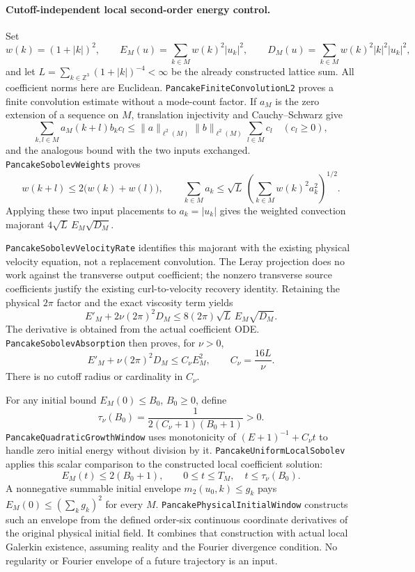 \documentclass[11pt]{article}
\theoremstyle{definition}
\begin{document}
\paragraph{Cutoff-independent local second-order energy control.}
Set
\[
 w(k)=(1+|k|)^2,\qquad
 E_M(u)=\sum_{k\in M}w(k)^2|u_k|^2,\qquad
 D_M(u)=\sum_{k\in M}w(k)^2|k|^2|u_k|^2,
\]
and let $L=\sum_{k\in\mathbb Z^3}(1+|k|)^{-4}<\infty$ be the
already constructed lattice sum. All coefficient norms here are Euclidean.
\texttt{PancakeFiniteConvolutionL2} proves a finite convolution estimate
without a mode-count factor. If $a_M$ is the zero extension of a sequence
on $M$, translation injectivity and Cauchy--Schwarz give
\[
 \sum_{k,l\in M}a_M(k+l)b_kc_l
 \le \|a\|_{\ell^2(M)}\|b\|_{\ell^2(M)}
           \sum_{l\in M}c_l
 \quad(c_l\ge0),
\]
and the analogous bound with the two inputs exchanged.
\texttt{PancakeSobolevWeights} proves
\[
 w(k+l)\le2\bigl(w(k)+w(l)\bigr),\qquad
 \sum_{k\in M}a_k\le\sqrt L\,
       \left(\sum_{k\in M}w(k)^2a_k^2\right)^{1/2}.
\]
Applying these two input placements to $a_k=|u_k|$ gives the
weighted convection majorant $4\sqrt L\,E_M\sqrt{D_M}$.

\texttt{PancakeSobolevVelocityRate} identifies this majorant with the
existing physical velocity equation, not a replacement convolution.
The Leray projection does no work against the transverse output
coefficient; the nonzero transverse source coefficients justify the
existing curl-to-velocity recovery identity. Retaining the physical
$2\pi$ factor and the exact viscosity term yields
\[
 E'_M+2\nu(2\pi)^2D_M
       \le8(2\pi)\sqrt L\,E_M\sqrt{D_M}.
\]
The derivative is obtained from the actual coefficient ODE.
\texttt{PancakeSobolevAbsorption} then proves, for $\nu>0$,
\[
 \boxed{\qquad E'_M+\nu(2\pi)^2D_M
                 \le C_\nu E_M^2,\qquad C_\nu=\frac{16L}{\nu}.\qquad}
\]
There is no cutoff radius or cardinality in $C_\nu$.

For any initial bound $E_M(0)\le B_0$, $B_0\ge0$, define
\[
 \tau_\nu(B_0)=\frac{1}{2(C_\nu+1)(B_0+1)}>0.
\]
\texttt{PancakeQuadraticGrowthWindow} uses monotonicity of
$(E+1)^{-1}+C_\nu t$ to handle zero initial energy without division by it.
\texttt{PancakeUniformLocalSobolev} applies this scalar comparison to the
constructed local coefficient solution:
\[
 E_M(t)\le2(B_0+1),\qquad
 0\le t\le T_M,\quad t\le\tau_\nu(B_0).
\]
A nonnegative summable initial envelope $m_2(u_0,k)\le g_k$ pays
$E_M(0)\le(\sum_k g_k)^2$ for every $M$.
\texttt{PancakePhysicalInitialWindow} constructs such an envelope from
the defined order-six continuous coordinate derivatives of the original
physical initial field. It combines that construction with actual local
Galerkin existence, assuming reality and the Fourier divergence condition.
No regularity or Fourier envelope of a future trajectory is an input.
\end{document}
